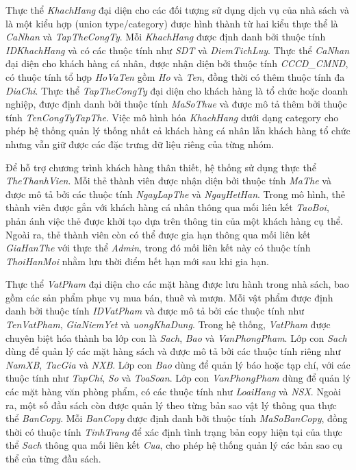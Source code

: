 Thực thể \textit{KhachHang} đại diện cho các đối tượng sử dụng dịch vụ của nhà sách và là một kiểu hợp (union type/category) được hình thành từ hai kiểu thực thể là \textit{CaNhan} và \textit{TapTheCongTy}. Mỗi \textit{KhachHang} được định danh bởi thuộc tính \textit{IDKhachHang} và có các thuộc tính như \textit{SDT} và \textit{DiemTichLuy}. Thực thể \textit{CaNhan} đại diện cho khách hàng cá nhân, được nhận diện bởi thuộc tính \textit{CCCD\_CMND}, có thuộc tính tổ hợp \textit{HoVaTen} gồm \textit{Ho} và \textit{Ten}, đồng thời có thêm thuộc tính đa  \textit{DiaChi}. Thực thể \textit{TapTheCongTy} đại diện cho khách hàng là tổ chức hoặc doanh nghiệp, được định danh bởi thuộc tính \textit{MaSoThue} và được mô tả thêm bởi thuộc tính \textit{TenCongTyTapThe}. Việc mô hình hóa \textit{KhachHang} dưới dạng category cho phép hệ thống quản lý thống nhất cả khách hàng cá nhân lẫn khách hàng tổ chức nhưng vẫn giữ được các đặc trưng dữ liệu riêng của từng nhóm.

Để hỗ trợ chương trình khách hàng thân thiết, hệ thống sử dụng thực thể \textit{TheThanhVien}. Mỗi thẻ thành viên được nhận diện bởi thuộc tính \textit{MaThe} và được mô tả bởi các thuộc tính \textit{NgayLapThe} và \textit{NgayHetHan}. Trong mô hình, thẻ thành viên được gắn với khách hàng cá nhân thông qua mối liên kết \textit{TaoBoi}, phản ánh việc thẻ được khởi tạo dựa trên thông tin của một khách hàng cụ thể. Ngoài ra, thẻ thành viên còn có thể được gia hạn thông qua mối liên kết \textit{GiaHanThe} với thực thể \textit{Admin}, trong đó mối liên kết này có thuộc tính \textit{ThoiHanMoi} nhằm lưu thời điểm hết hạn mới sau khi gia hạn.

Thực thể \textit{VatPham} đại diện cho các mặt hàng được lưu hành trong nhà sách, bao gồm các sản phẩm phục vụ mua bán, thuê và mượn. Mỗi vật phẩm được định danh bởi thuộc tính \textit{IDVatPham} và được mô tả bởi các thuộc tính như \textit{TenVatPham}, \textit{GiaNiemYet} và \textit{uongKhaDung}. Trong hệ thống, \textit{VatPham} được chuyên biệt hóa thành ba lớp con là \textit{Sach}, \textit{Bao} và \textit{VanPhongPham}. Lớp con \textit{Sach} dùng để quản lý các mặt hàng sách và được mô tả bởi các thuộc tính riêng như \textit{NamXB}, \textit{TacGia} và \textit{NXB}. Lớp con \textit{Bao} dùng để quản lý báo hoặc tạp chí, với các thuộc tính như \textit{TapChi}, \textit{So} và \textit{ToaSoan}. Lớp con \textit{VanPhongPham} dùng để quản lý các mặt hàng văn phòng phẩm, có các thuộc tính như \textit{LoaiHang} và \textit{NSX}. Ngoài ra, một số đầu sách còn được quản lý theo từng bản sao vật lý thông qua thực thể \textit{BanCopy}. Mỗi \textit{BanCopy} được định danh bởi thuộc tính \textit{MaSoBanCopy}, đồng thời có thuộc tính \textit{TinhTrang} để xác định tình trạng bản copy hiện tại của thực thể \textit{Sach} thông qua mối liên kết \textit{Cua}, cho phép hệ thống quản lý các bản sao cụ thể của từng đầu sách.

